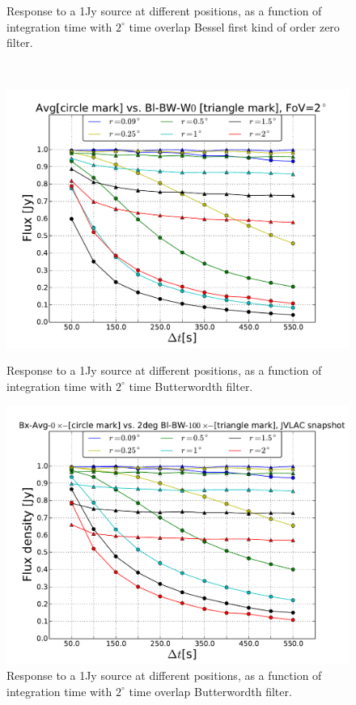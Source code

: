 \documentclass[useAMS,usenatbib]{mn2e}
\begin{document}
\begin{figure}
\begin{minipage}{0.36\linewidth}
    \caption{Response to a 1Jy source at different positions, as a function of integration time with $2^{\circ}$ time overlap 
      Bessel first kind of order zero filter.}
    \label{fig:max-integ-time-bessel-w100x1-fov2}\end{minipage}\\
\begin{minipage}{0.36\linewidth}\includegraphics[width=1\textwidth]{./Figures/max-integ-time-butter-w1x1-fov2.pdf}
    \caption{Response to a 1Jy source at different positions, as a function of integration time with $2^{\circ}$ time Butterwordth 
filter.}
    \label{fig:max-integ-time-butter-w1x1-fov2}
    \end{minipage} 
 \hspace{1cm}
\begin{minipage}{0.36\linewidth}\includegraphics[width=1\textwidth]{./Figures/max-integ-time-butter-w100x1-fov2.pdf}
    \caption{Response to a 1Jy source at different positions, as a function of integration time with $2^{\circ}$ time overlap 
      Butterwordth filter.}
    \label{fig:max-integ-time-butter-w100x1-fov2}\end{minipage}   
\end{figure}
\end{document}
